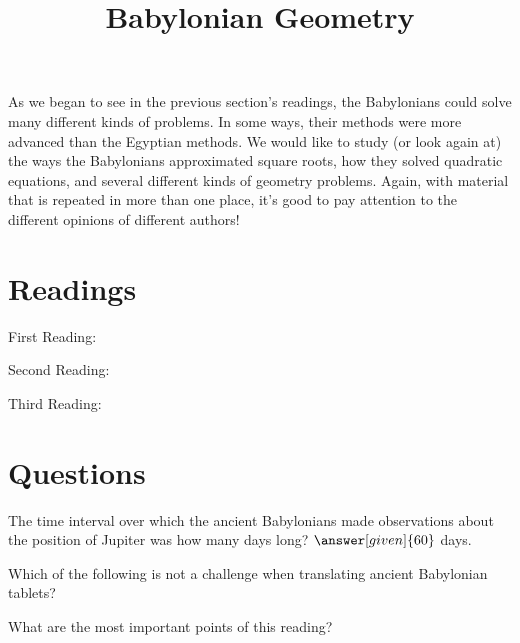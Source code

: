\documentclass{ximera}
\title{Babylonian Geometry}
\begin{document}
\begin{abstract}
\end{abstract}
\maketitle

As we began to see in the previous section's readings, the Babylonians could solve many different kinds of problems. In some ways, their methods were more advanced than the Egyptian methods.  We would like to study (or look again at) the ways the Babylonians approximated square roots, how they solved quadratic equations, and several different kinds of geometry problems.  Again, with material that is repeated in more than one place, it's good to pay attention to the different opinions of different authors!




\section{Readings}

First Reading: 

Second Reading: 

Third Reading: 




\section{Questions}

\begin{question}
The time interval over which the ancient Babylonians made observations about the position of Jupiter was how many days long?  $\answer[given]{60}$ days.
\end{question}


\begin{question}
Which of the following is not a challenge when translating ancient Babylonian tablets?
\begin{multipleChoice}
\end{multipleChoice}
\end{question}



\begin{question}
What are the most important points of this reading?
\begin{freeResponse}
\end{freeResponse}
\end{question}
\end{document}
